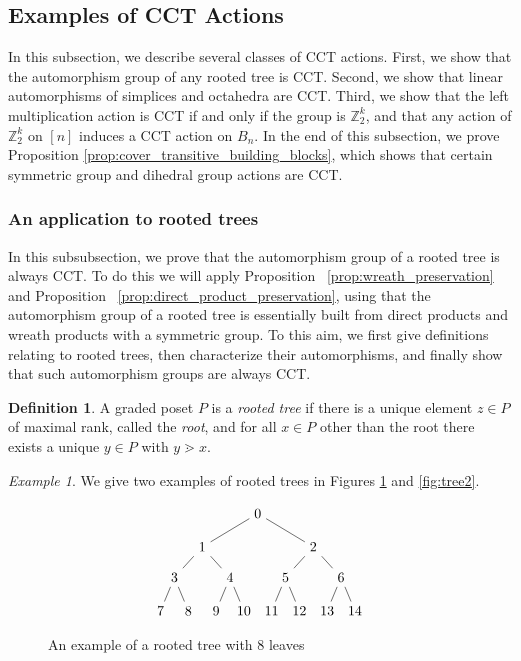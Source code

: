 \documentclass[smallextended, envcountsame, numbook]{svjour3}
\theoremstyle{plain}
\theoremstyle{definition}
\newtheorem{defn}[thm]{Definition}
\theoremstyle{remark}
\newtheorem{eg}[thm]{Example}
\numberwithin{equation}{section}
\newcommand\ssec{\subsection}
\newcommand\sssec{\subsubsection}
\begin{document}

\ssec{Examples of CCT Actions}\label{ssec:CCT_examples}

In this subsection, we describe several classes of CCT actions. First, we show that the automorphism group of any rooted tree is CCT. Second, we show that linear automorphisms of simplices and octahedra are CCT. Third, we show that the left multiplication action is CCT if and only if the group is $\mathbb Z_2^k$, and that any action of $\mathbb Z_2^k$ on $[n]$ induces a CCT action on $B_n$. In the end of this subsection, we prove Proposition \ref{prop:cover_transitive_building_blocks}, which shows that certain symmetric group and dihedral group actions are CCT.

\sssec{An application to rooted trees}
\label{ssec:rooted_trees}
In this subsubsection, we prove that the automorphism group of a rooted tree is always CCT. To do this we will apply Proposition ~\ref{prop:wreath_preservation} and Proposition ~\ref{prop:direct_product_preservation}, using that the automorphism group of a  rooted tree is essentially built from direct products and wreath products with a symmetric group. To this aim, we first give definitions relating to rooted trees, then characterize their automorphisms, and finally show that such automorphism groups are always CCT.

\begin{defn}
A graded poset $P$ is a {\it rooted tree} if there is a unique element $z \in P$ of maximal rank, called the {\it root}, and for all $x \in P$ other than the root there exists a unique $y \in P$ with $y \gtrdot x$.
\end{defn}

\begin{eg}
We give two examples of rooted trees in Figures \ref{fig:tree1} and \ref{fig:tree2}.
\end{eg}
\begin{figure}[h!]
\[\begin{tikzpicture}[scale=.7]
  \node (0) at (-4,0) {$7$};
  \node (1) at (-3,0) {$8$};
  \node (2) at (-2,0) {$9$};
  \node (3) at (-1,0) {$10$};
    \node (4) at (0,0) {$11$};
  \node (5) at (1,0) {$12$};
  \node (6) at (2,0) {$13$};
  \node (7) at (3,0) {$14$};
  \node (8) at (-3.5,1.2) {$3$};
  \node (9) at (-1.5,1.2) {$4$};
  \node (10) at (.5,1.2) {$5$};
  \node (11) at (2.5,1.2) {$6$};
    \node (12) at (-2.5,2.3) {$1$};
  \node (13) at (1.5,2.3) {$2$};
  \node (14) at (-.5,3.5) {$0$};
  \draw (0)--(8);
  \draw (1)--(8);
  \draw (2)--(9);
  \draw (3)--(9);
  \draw (4)--(10);
  \draw (5)--(10);
  \draw (6)--(11);
  \draw (7)--(11);
  \draw (8)--(12);
  \draw (9)--(12);
  \draw (10)--(13);
  \draw (11)--(13);
  \draw (12)--(14);
  \draw (13)--(14);
\end{tikzpicture}\]
\caption{\label{fig:tree1} An example of a rooted tree with $8$ leaves}
\end{figure}
\end{document}
